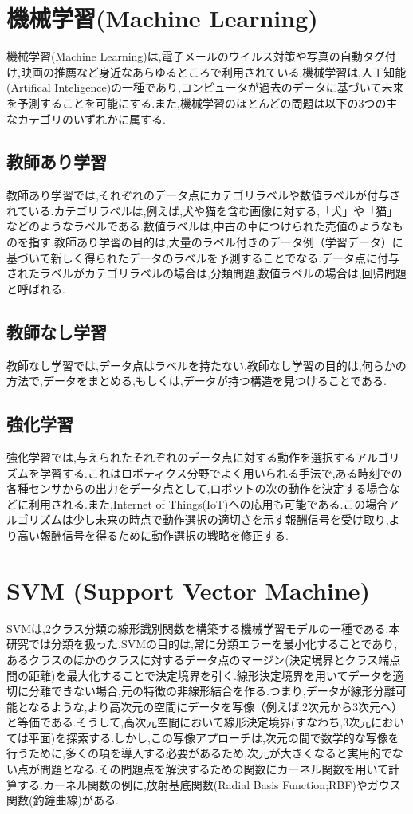 \documentclass{thesis}
\begin{document}
\section{機械学習(Machine Learning)}
機械学習(Machine Learning)は,電子メールのウイルス対策や写真の自動タグ付け,映画の推薦など身近なあらゆるところで利用されている.機械学習は,人工知能(Artifical Inteligence)の一種であり,コンピュータが過去のデータに基づいて未来を予測することを可能にする.また,機械学習のほとんどの問題は以下の3つの主なカテゴリのいずれかに属する.
\subsection*{教師あり学習}
教師あり学習では,それぞれのデータ点にカテゴリラベルや数値ラベルが付与されている.カテゴリラベルは,例えば,犬や猫を含む画像に対する,「犬」や「猫」などのようなラベルである.数値ラベルは,中古の車につけられた売値のようなものを指す.教師あり学習の目的は,大量のラベル付きのデータ例（学習データ）に基づいて新しく得られたデータのラベルを予測することでなる.データ点に付与されたラベルがカテゴリラベルの場合は,分類問題,数値ラベルの場合は,回帰問題と呼ばれる.
\subsection*{教師なし学習}
教師なし学習では,データ点はラベルを持たない.教師なし学習の目的は,何らかの方法で,データをまとめる,もしくは,データが持つ構造を見つけることである.
\subsection*{強化学習}
強化学習では,与えられたそれぞれのデータ点に対する動作を選択するアルゴリズムを学習する.これはロボティクス分野でよく用いられる手法で,ある時刻での各種センサからの出力をデータ点として,ロボットの次の動作を決定する場合などに利用される.また,Internet of Things(IoT)への応用も可能である.この場合アルゴリズムは少し未来の時点で動作選択の適切さを示す報酬信号を受け取り,より高い報酬信号を得るために動作選択の戦略を修正する.


\section{SVM (Support Vector Machine)}
SVMは,2クラス分類の線形識別関数を構築する機械学習モデルの一種である.本研究では分類を扱った.SVMの目的は,常に分類エラーを最小化することであり,あるクラスのほかのクラスに対するデータ点のマージン(決定境界とクラス端点間の距離)を最大化することで決定境界を引く.線形決定境界を用いてデータを適切に分離できない場合,元の特徴の非線形結合を作る.つまり,データが線形分離可能となるような,より高次元の空間にデータを写像（例えば,2次元から3次元へ）と等価である.そうして,高次元空間において線形決定境界(すなわち,3次元においては平面)を探索する.しかし,この写像アプローチは,次元の間で数学的な写像を行うために,多くの項を導入する必要があるため,次元が大きくなると実用的でない点が問題となる.その問題点を解決するための関数にカーネル関数を用いて計算する.カーネル関数の例に,放射基底関数(Radial Basis Function;RBF)やガウス関数(釣鐘曲線)がある.
\end{document}
